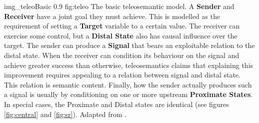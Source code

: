 \begin{myfig}
    {img_teleoBasic} %
    {0.9} %
    {fig:teleo} %
    {The basic teleosemantic model. 
    A \textbf{Sender} and \textbf{Receiver} have a joint goal they must achieve. 
    This is modelled as the requirement of setting a \textbf{Target} variable to a certain value. 
    The receiver can exercise some control, but a \textbf{Distal State} also has causal influence over the target. 
    The sender can produce a \textbf{Signal} that bears an exploitable relation to the distal state.
    When the receiver can condition its behaviour on the signal and achieve greater success than otherwise, teleosemantics claims that explaining this improvement requires appealing to a relation between signal and distal state.
    This relation is semantic content.
    Finally, how the sender actually produces such a signal is usually by conditioning on one or more upstream \textbf{Proximate States}.
    In special cases, the Proximate and Distal states are identical (see figures \ref{fig:central} and \ref{fig:sr}).
    Adapted from \citet[fig. 6.3, p. 78]{millikan2004varieties}.
    } %
\end{myfig}